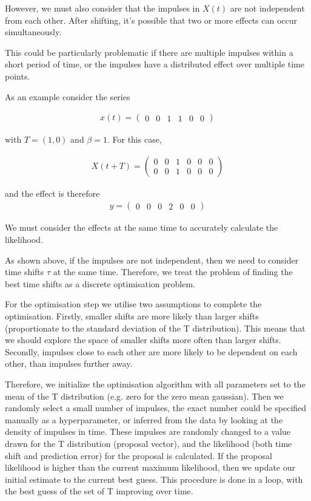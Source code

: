 \documentclass[11pt]{amsart}
\begin{document}
However, we must also consider that the impulses in $X(t)$ are not independent from each other. After shifting, it's possible that two or more effects can occur simultaneously.

This could be particularly problematic if there are multiple impulses within a short period of time, or the impulses have a distributed effect over multiple time points. 

As an example consider the series 

\begin{align}
x(t) = 
\left(
\begin{array}{cccccc}
0 & 0 & 1 & 1 & 0 & 0
\end{array}  
\right)
\end{align}

with $T= (1, 0)$ and $\beta = 1$. For this case, 

\begin{align}
X(t + T) = 
\left(
\begin{array}{cccccc}
0 & 0 & 1 & 0 & 0 & 0 \\
0 & 0 & 1 & 0 & 0 & 0 
\end{array}  
\right)
\end{align}

and the effect is therefore 
\begin{align}
y = 
\left(
\begin{array}{cccccc}
0 & 0 & 0 & 2 & 0 & 0
\end{array}  
\right)
\end{align}

We must consider the effects at the same time to accurately calculate the likelihood.

As shown above, if the impulses are not independent, then we need to consider time shifts $\tau$ at the same time. Therefore, we treat the problem of finding the best time shifts as a discrete optimisation problem.

For the optimisation step we utilise two assumptions to complete the optimisation. Firstly, smaller shifts are more likely than larger shifts (proportionate to the standard deviation of the T distribution). This means that we should explore the space of smaller shifts more often than larger shifts. Secondly, impulses close to each other are more likely to be dependent on each other,  than impulses further away. 

Therefore, we initialize the optimisation algorithm with all parameters set to the mean of the T distribution (e.g. zero for the zero mean gaussian). Then we randomly select a small number of impulses, the exact number could be specified manually as a hyperparameter, or inferred from the data by looking at the density of impulses in time. These impulses are randomly changed to a value drawn for the T distribution (proposal vector), and the likelihood (both time shift and prediction error) for the proposal is calculated. If the proposal likelihood is higher than the current maximum likelihood, then we update our initial estimate to the current best guess. This procedure is done in a loop, with the best guess of the set of T improving over time.
\end{document}
